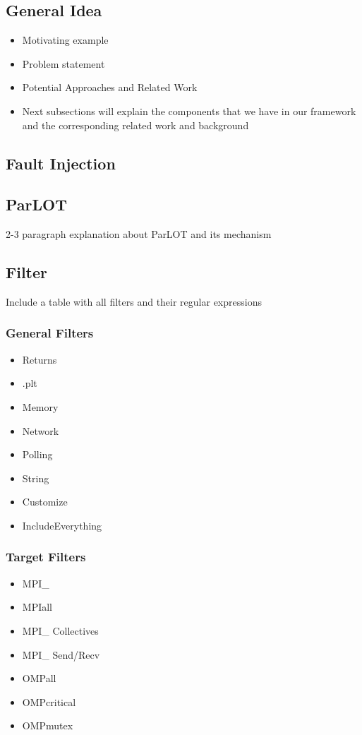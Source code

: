 \subsection{General Idea}
\begin{itemize}
\item Motivating example 
\item Problem statement
\item Potential Approaches and Related Work
\item Next subsections will explain the components that we have in our framework and the corresponding related work and background
\end{itemize}
\subsection{Fault Injection}
\subsection{ParLOT}
2-3 paragraph explanation about ParLOT and its mechanism \cite{parlot}
\subsection{Filter}
Include a table with all filters and their regular expressions
\subsubsection{General Filters}
\begin{itemize}
\item Returns
\item .plt
\item Memory
\item Network
\item Polling
\item String
\item Customize
\item IncludeEverything
\end{itemize}
\subsubsection{Target Filters}
\begin{itemize}
\item MPI\_
\item MPIall
\item MPI\_ Collectives
\item MPI\_ Send/Recv
\item OMPall
\item OMPcritical
\item OMPmutex
\end{itemize}

